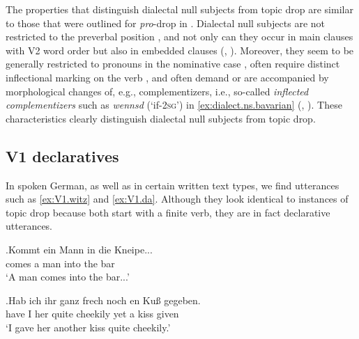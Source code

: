 The properties that distinguish dialectal null subjects from topic drop are similar to those that were outlined for \textit{pro}-drop  in .
Dialectal null subjects are not restricted to the preverbal position \citep[23]{fries1988}, and not only can they occur in main clauses with V2 word order but also in embedded clauses  (\cite[23]{fries1988}, \cite[171]{rosenkvist2009}).
Moreover, they seem to be generally restricted to pronouns in the nominative case  \citep[23]{fries1988}, often require distinct inflectional marking  on the verb \citep[163]{rosenkvist2009}, and often demand or are accompanied by morphological changes of, e.g., complementizers,  i.e., so-called \textit{inflected complementizers}  such as \textit{wennsd} (`if-\textsc{2sg}') in \ref{ex:dialect.ns.bavarian} (\cite[23]{fries1988}, \cite[162]{rosenkvist2009}).
These characteristics clearly distinguish dialectal null subjects from topic drop.

\subsection{V1 declaratives}\label{sec:def.v1}
In spoken German, as well as in certain written text types,  we find utterances such as \ref{ex:V1.witz} and \ref{ex:V1.da}.
Although they look identical to instances of topic drop because both start with a finite verb, they are in fact declarative utterances.

\exg.\label{ex:V1.witz}Kommt ein Mann in die Kneipe...\\
comes a man into the bar\\
`A man comes into the bar...' \citep[50, shortened]{oennerfors1997}

\exg.\label{ex:V1.da}Hab ich ihr ganz frech noch en Kuß gegeben.\\
have I her quite cheekily yet a kiss given\\
`I gave her another kiss quite cheekily.' \citep[99, shortened]{oennerfors1997}

